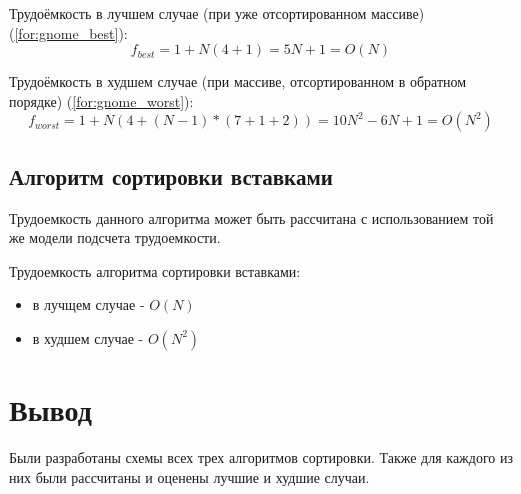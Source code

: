 Трудоёмкость в лучшем случае (при уже отсортированном массиве) (\ref{for:gnome_best}):
\begin{equation}
	\label{for:gnome_best}
    f_{best} = 1 + N(4 + 1) = 5N + 1 = O(N)
\end{equation}

Трудоёмкость в худшем случае (при массиве, отсортированном в обратном порядке) (\ref{for:gnome_worst}):
\begin{equation}
	\label{for:gnome_worst}
    f_{worst} = 1 + N(4 + (N - 1) * (7 + 1 + 2)) = 10N^2 - 6N + 1 = O(N^2)
\end{equation}


\subsection{Алгоритм сортировки вставками}
Трудоемкость данного алгоритма может быть рассчитана с использованием той же модели подсчета трудоемкости.

Трудоемкость алгоритма сортировки вставками:
\begin{itemize}
	\item в лучщем случае - $O(N)$
    \item в худшем случае - $O(N^2)$ \newline
\end{itemize}



\section*{Вывод}

Были разработаны схемы всех трех алгоритмов сортировки. Также для каждого из них были рассчитаны и оценены лучшие и худшие случаи.

